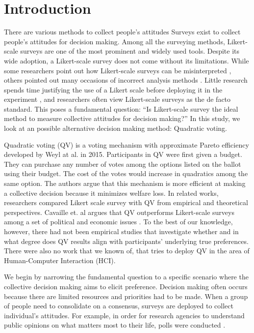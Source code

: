 \section{Introduction}
There are various methods to collect
people's attitudes
Surveys exist 
to collect people's attitudes 
for decision making.
Among all the surveying methods, 
Likert-scale surveys 
are one of the most prominent 
and widely used tools.
Despite its wide adoption,
a Likert-scale survey does not come without its limitations.
While some researchers 
point out how Likert-scale surveys can be misinterpreted \cite{jamieson2004likert, pell2005use},
others pointed out many occasions of incorrect analysis methods \cite{bishop2015use}.
Little research spends time
justifying the use of a Likert scale 
before deploying it in the experiment
, and researchers often view 
Likert-scale surveys as the de facto standard.
This poses a fundamental question: 
``Is Likert-scale survey the ideal method
to measure collective attitudes for decision making?''
In this study, we look at an possible alternative
decision making method: Quadratic voting.

Quadratic voting (QV) is a voting mechanism 
with approximate Pareto efficiency 
developed by Weyl at al. \cite{posner2018radical} in 2015.
Participants in QV were first given a budget.
They can purchase any number of votes 
among the options listed on the ballot 
using their budget.
The cost of the votes would increase 
in quadratics among the same option.
The authors argue that 
this mechanism is more efficient 
at making a collective decision 
because it minimizes welfare loss.
In related works, 
researchers compared Likert scale survey with QV 
from empirical and theoretical perspectives\cite{quarfoot2017quadratic, naylor2017first}.
Cavaille et. al argues that 
QV outperforms Likert-scale surveys among a set of political and economic issues \cite{cavaille2018towards}.
To the best of our knowledge, however, 
there had not been empirical studies 
that investigate whether and in what degree
does QV results align with 
participants' underlying true preferences.
There were also no work that we known of,
that tries to deploy QV 
in the area of Human-Computer Interaction (HCI).

We begin by narrowing the fundamental question
to a specific scenario
where the collective decision making aims to
elicit preference.
Decision making often occurs 
because there are limited resources
and priorities had to be made.
When a group of people 
need to consolidate on a consensus,
surveys are deployed 
to collect individual's attitudes.
For example, 
in order for 
research agencies to understand public opinions
on what matters most to their life,
polls were conducted \cite{}.

